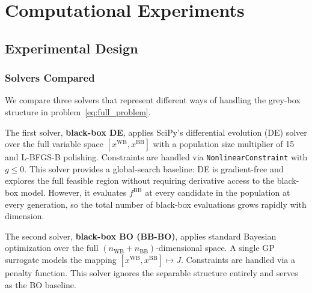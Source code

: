\documentclass[12pt,a4paper]{article}%
\theoremstyle{plain}%
\theoremstyle{remark}%
\theoremstyle{definition}%
\def\WB{\mathrm{WB}}
\def\BB{\mathrm{BB}}
\begin{document}

\section{Computational Experiments}\label{sec:experiments}\label{sec:results}

\subsection{Experimental Design}\label{sec:experimental_setup}

\subsubsection{Solvers Compared}\label{subsec:solvers_compared}

We compare three solvers that represent different ways of handling the grey-box structure in problem~\eqref{eq:full_problem}.

The first solver, \textbf{black-box DE}, applies SciPy's differential evolution (DE) solver over the full variable space $[x^{\WB}, x^{\BB}]$ with a population size multiplier of 15 and L-BFGS-B polishing. Constraints are handled via \texttt{NonlinearConstraint} with $g \leq 0$. This solver provides a global-search baseline: DE is gradient-free and explores the full feasible region without requiring derivative access to the black-box model. However, it evaluates $f^{\BB}$ at every candidate in the population at every generation, so the total number of black-box evaluations grows rapidly with dimension.

The second solver, \textbf{black-box BO (BB-BO)}, applies standard Bayesian optimization over the full $(n_{\WB}+n_{\BB})$-dimensional space. A single GP surrogate models the mapping $[x^{\WB}, x^{\BB}] \mapsto J$. Constraints are handled via a penalty function. This solver ignores the separable structure entirely and serves as the BO baseline.
\end{document}
